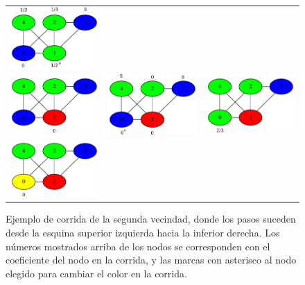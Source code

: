 \documentclass{article}
\theoremstyle{definition}
\theoremstyle{remark}
\begin{document}
\begin{figure}
\begin{minipage}{0.80\textwidth}
\begin{tabular}{ccc}
            \includegraphics[width=4cm]{examples/4/2/example4_2_4.png} \\
            \includegraphics[width=4cm]{examples/4/2/example4_2_5.png} &
            \includegraphics[width=4cm]{examples/4/2/example4_2_6.png} &
            \includegraphics[width=4cm]{examples/4/2/example4_2_7.png} \\
            \includegraphics[width=4cm]{examples/4/2/example4_2_8.png}
        \end{tabular}
    \end{minipage}
    \caption{Ejemplo de corrida de la segunda vecindad, donde los pasos suceden desde la esquina superior izquierda hacia la inferior derecha. Los números mostrados arriba de los nodos se corresponden con el coeficiente del nodo en la corrida, y las marcas con asterisco al nodo elegido para cambiar el color en la corrida. \label{grf:ex4-example-1}}
\end{figure}
\end{document}
